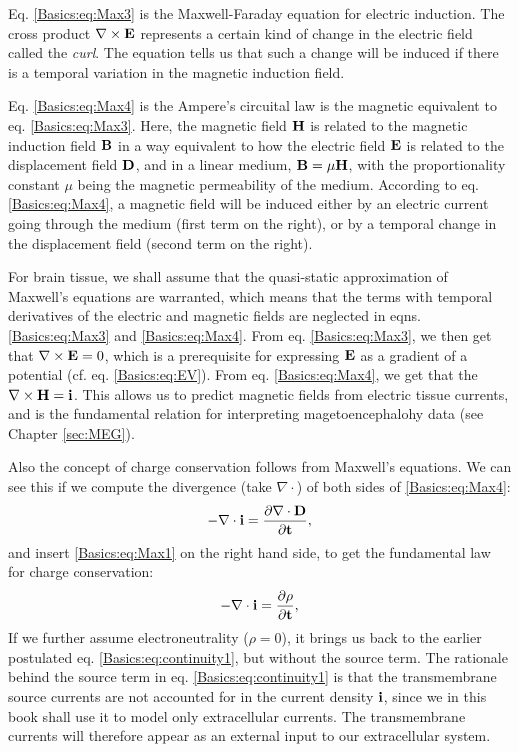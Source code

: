 Eq. \ref{Basics:eq:Max3} is the Maxwell-Faraday equation for electric induction. The cross product $\nabla \times {\bf E}$ represents a certain kind of change in the electric field called the \textit{curl}. The equation tells us that such a change will be induced if there is a temporal variation in the magnetic induction field. 

Eq.  \ref{Basics:eq:Max4} is the Ampere's circuital law is the magnetic equivalent to eq. \ref{Basics:eq:Max3}. Here, the magnetic field ${\bf H}$ is related to the magnetic induction field ${\bf B}$ in a way equivalent to how the electric field ${\bf E}$ is related to the displacement field ${\bf D}$, and in a linear medium, ${\bf B} = \mu{\bf H}$, with the proportionality constant $\mu$ being the magnetic permeability of the medium. According to eq. \ref{Basics:eq:Max4}, a magnetic field will be induced either by an electric current going through the medium (first term on the right), or by a temporal change in the displacement field (second term on the right). 

For brain tissue, we shall assume that the quasi-static approximation of Maxwell's equations are warranted, which means that the terms with temporal derivatives of the electric and magnetic fields are neglected in eqns.  \ref{Basics:eq:Max3} and  \ref{Basics:eq:Max4}. From eq. \ref{Basics:eq:Max3}, we then get that $\nabla \times {\bf E} = 0$, which is a prerequisite for expressing ${\bf E}$ as a gradient of a potential (cf. eq. \ref{Basics:eq:EV}). From eq. \ref{Basics:eq:Max4}, we get that the $\nabla \times {\bf H} = \bf{i}$. This allows us to predict magnetic fields from electric tissue currents, and is the fundamental relation for interpreting magetoencephalohy data (see Chapter \ref{sec:MEG}).

Also the concept of charge conservation follows from Maxwell's equations. We can see this if we 
compute the divergence (take $\nabla \cdot$) of both sides of \ref{Basics:eq:Max4}:
\begin{equation}
- \nabla \cdot \bf{i} =  \frac{\partial {\bf \nabla \cdot D}}{\partial t}, 
\label{Basics:eq:Max4dot}
\end{equation}
and insert \ref{Basics:eq:Max1} on the right hand side, to get the fundamental law for charge conservation:
\begin{equation}
- \nabla \cdot \bf{i} =  \frac{\partial \rho}{\partial t},
\label{Basics:eq:Max4dot1}
\end{equation}
If we further assume electroneutrality ($\rho = 0$), it brings us back to the earlier postulated eq. \ref{Basics:eq:continuity1}, but without the source term. The rationale behind the source term in 
eq. \ref{Basics:eq:continuity1} is that the transmembrane source currents are not accounted for in the current density $\bf{i}$, since we in this book shall use it to model only extracellular currents. The transmembrane currents will therefore appear as an external input to our extracellular system. 
